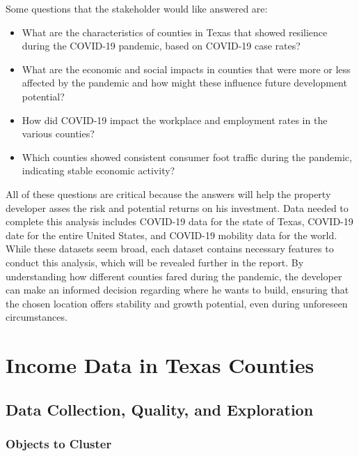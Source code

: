 \documentclass[
]{article}
\providecommand{\tightlist}{%
  \setlength{\itemsep}{0pt}\setlength{\parskip}{0pt}}
\begin{document}
Some questions that the stakeholder would like answered are:

\begin{itemize}
\tightlist
\item
  What are the characteristics of counties in Texas that showed
  resilience during the COVID-19 pandemic, based on COVID-19 case rates?
\item
  What are the economic and social impacts in counties that were more or
  less affected by the pandemic and how might these influence future
  development potential?
\item
  How did COVID-19 impact the workplace and employment rates in the
  various counties?
\item
  Which counties showed consistent consumer foot traffic during the
  pandemic, indicating stable economic activity?
\end{itemize}

All of these questions are critical because the answers will help the
property developer asses the risk and potential returns on his
investment. Data needed to complete this analysis includes COVID-19 data
for the state of Texas, COVID-19 date for the entire United States, and
COVID-19 mobility data for the world. While these datasets seem broad,
each dataset contains necessary features to conduct this analysis, which
will be revealed further in the report. By understanding how different
counties fared during the pandemic, the developer can make an informed
decision regarding where he wants to build, ensuring that the chosen
location offers stability and growth potential, even during unforeseen
circumstances.

\newpage

\section{Income Data in Texas
Counties}\label{income-data-in-texas-counties}

\subsection{Data Collection, Quality, and
Exploration}\label{data-collection-quality-and-exploration}

\subsubsection{Objects to Cluster}\label{objects-to-cluster}
\end{document}
